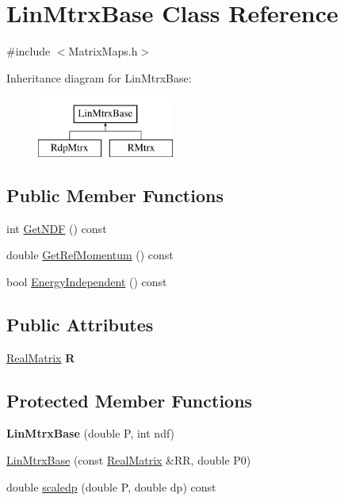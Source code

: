 \hypertarget{classLinMtrxBase}{}\section{Lin\+Mtrx\+Base Class Reference}
\label{classLinMtrxBase}


{\ttfamily \#include $<$Matrix\+Maps.\+h$>$}

Inheritance diagram for Lin\+Mtrx\+Base\+:\begin{figure}[H]
\begin{center}
\leavevmode
\includegraphics[height=2.000000cm]{classLinMtrxBase}
\end{center}
\end{figure}
\subsection*{Public Member Functions}
\begin{DoxyCompactItemize}
\item 
int \hyperlink{classLinMtrxBase_abd9d5bbf418c4f59c0b8398e563e9145}{Get\+N\+DF} () const
\item 
double \hyperlink{classLinMtrxBase_ad87096504b60b12224fdd87ad8120d37}{Get\+Ref\+Momentum} () const
\item 
bool \hyperlink{classLinMtrxBase_afc223d6f5ecc5f29900fc1826a52e06d}{Energy\+Independent} () const
\end{DoxyCompactItemize}
\subsection*{Public Attributes}
\begin{DoxyCompactItemize}
\item 
\mbox{\label{classLinMtrxBase_aa18a835d2d0b0509048b3a76fd1f9cf8}} 
\hyperlink{classTLAS_1_1Matrix}{Real\+Matrix} {\bfseries R}
\end{DoxyCompactItemize}
\subsection*{Protected Member Functions}
\begin{DoxyCompactItemize}
\item 
\mbox{\label{classLinMtrxBase_abfd11ce1b8ecea951a84182de3936ce1}} 
{\bfseries Lin\+Mtrx\+Base} (double P, int ndf)
\item 
\hyperlink{classLinMtrxBase_a1fe32642d8171e69eed4de24951e6ccc}{Lin\+Mtrx\+Base} (const \hyperlink{classTLAS_1_1Matrix}{Real\+Matrix} \&RR, double P0)
\item 
double \hyperlink{classLinMtrxBase_a9123e5c023982c2602d7d42d5a5ddf9c}{scaledp} (double P, double dp) const
\end{DoxyCompactItemize}
